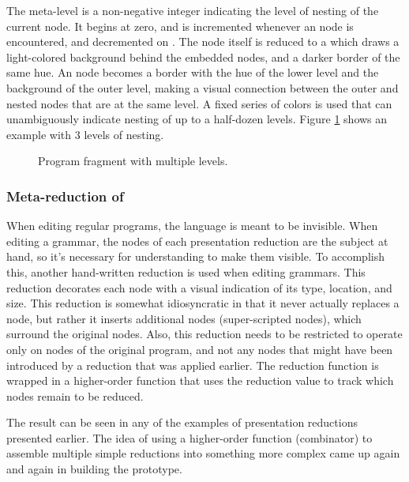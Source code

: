 The meta-level is a non-negative integer indicating the level of nesting of the current node. It begins at zero, and is incremented whenever an  node is encountered, and decremented on . The  node itself is reduced to a  which draws a light-colored background behind the embedded nodes, and a darker border of the same hue. An  node becomes a border with the hue of the lower level and the background of the outer level, making a visual connection between the outer and nested nodes that are at the same level. A fixed series of colors is used that can unambiguously indicate nesting of up to a half-dozen levels. Figure \ref{fig-levels} shows an example with 3 levels of nesting.

\begin{figure}[ht]
\caption{\label{fig-levels} Program fragment with multiple levels.}
\end{figure}


\subsubsection{Meta-reduction of }
When editing regular programs, the  language is meant to be invisible. When editing a grammar, the  nodes of each presentation reduction are the subject at hand, so it's necessary for understanding to make them visible. To accomplish this, another hand-written reduction is used when editing grammars. This reduction decorates each node with a visual indication of its type, location, and size. This reduction is somewhat idiosyncratic in that it never actually replaces a node, but rather it inserts additional nodes (super-scripted  nodes), which surround the original nodes. Also, this reduction needs to be restricted to operate only on  nodes of the original program, and not any nodes that might have been introduced by a reduction that was applied earlier. The reduction function is wrapped in a higher-order function that uses the reduction value to track which nodes remain to be reduced.

The result can be seen in any of the examples of presentation reductions presented earlier. The idea of using a higher-order function (combinator) to assemble multiple simple reductions into something more complex came up again and again in building the prototype.


